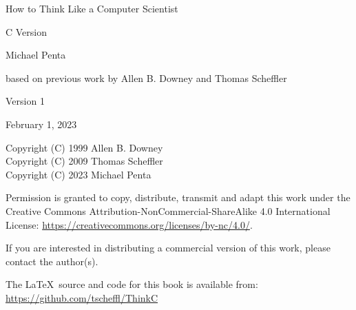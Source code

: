 \documentclass[a4paper]{book}
\begin{document}
\thispagestyle{empty}

\begin{flushright}
\vspace*{2.5in}

{\huge How to Think Like a Computer Scientist}

\vspace{0.25in}

{\LARGE C Version}

\vspace{1in}

{\Large Michael Penta}

{based on previous work by Allen B. Downey and Thomas Scheffler}

\vspace{1in}

{\Large Version 1}

{\small February 1, 2023}
\vfill

\end{flushright}



Copyright (C) 1999  Allen B. Downey\\
Copyright (C) 2009  Thomas Scheffler\\
Copyright (C) 2023 Michael Penta\\

\vspace{0.25in}

Permission is granted to copy, distribute, transmit and adapt this
work under the Creative Commons Attribution-NonCommercial-ShareAlike 4.0
International License: \url{https://creativecommons.org/licenses/by-nc/4.0/}.

If you are interested in distributing a commercial version of this
work, please contact the author(s).

The \LaTeX\ source and code for this book is available from: \\
\url{https://github.com/tscheffl/ThinkC}

\frontmatter
\tableofcontents

\mainmatter




%
%
%
%
%


\appendix



\printindex
\end{document}
